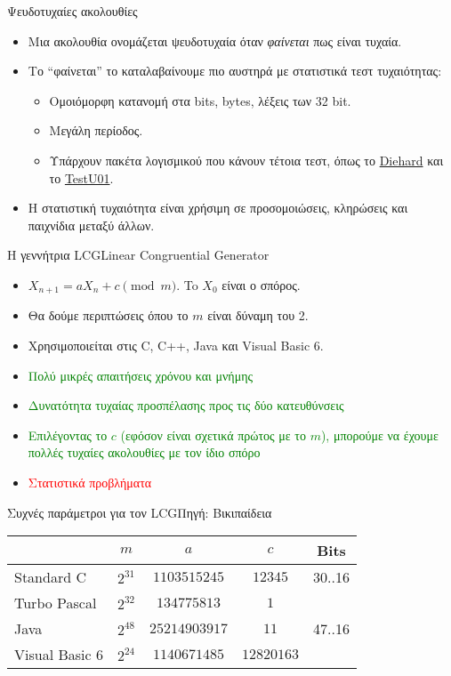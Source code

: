 \documentclass{beamer}
\begin{document}
\begin{frame}{Ψευδοτυχαίες ακολουθίες}
	\begin{itemize}
		\item<2-> Μια ακολουθία ονομάζεται \alert{ψευδοτυχαία} όταν \textit{φαίνεται} πως είναι τυχαία.
		\item<3-> Το ``φαίνεται'' το καταλαβαίνουμε πιο αυστηρά με \alert{στατιστικά τεστ τυχαιότητας}:
		\begin{itemize}
			\item<4-> Ομοιόμορφη κατανομή στα bits, bytes, λέξεις των 32 bit.
			\item<5-> Μεγάλη περίοδος.
			\item<6-> Υπάρχουν πακέτα λογισμικού που κάνουν τέτοια τεστ, όπως το \href{https://en.wikipedia.org/wiki/Diehard_tests}{Diehard} και το \href{https://en.wikipedia.org/wiki/TestU01}{TestU01}.
		\end{itemize}
		\item<7-> Η στατιστική τυχαιότητα είναι χρήσιμη σε προσομοιώσεις, κληρώσεις και παιχνίδια μεταξύ άλλων.
	\end{itemize}
\end{frame}

\begin{frame}{Η γεννήτρια LCG}{Linear Congruential Generator}
	\begin{itemize}
		\item <2-> $X_{n + 1} = aX_n + c \pmod m$. To $X_0$ είναι ο σπόρος.
		\item <3-> Θα δούμε περιπτώσεις όπου το $m$ είναι δύναμη του 2.
		\item <4-> Χρησιμοποιείται στις C, C++, Java και Visual Basic 6.
		\item <5-> \textcolor{green}{Πολύ μικρές απαιτήσεις χρόνου και μνήμης}
		\item <6-> \textcolor{green}{Δυνατότητα τυχαίας προσπέλασης προς τις δύο κατευθύνσεις}
		\item <7-> \textcolor{green}{Επιλέγοντας το $c$ (εφόσον είναι σχετικά πρώτος με το $m$), μπορούμε να έχουμε πολλές τυχαίες ακολουθίες με τον ίδιο σπόρο}
		\item <8-> \textcolor{red}{Στατιστικά προβλήματα}
	\end{itemize}
\end{frame}

\begin{frame}{Συχνές παράμετροι για τον LCG}{Πηγή: Βικιπαίδεια}
	\begin{table}
	\begin{tabular}[c]{l | c | c | c | c }
		& $m$ & $a$ & $c$ & Bits \\
		\hline
		Standard C & $2^{31}$ & $1103515245$ & $12345$ & 30..16 \\
		Turbo Pascal & $2^{32}$ & $134775813$ & $1$ & \\
		Java & $2^{48}$ & $25214903917$ & $11$ & 47..16 \\
		Visual Basic 6 & $2^{24}$ & $1140671485$ & $12820163$ & \\
	\end{tabular}
	\end{table}
\end{frame}
\end{document}
